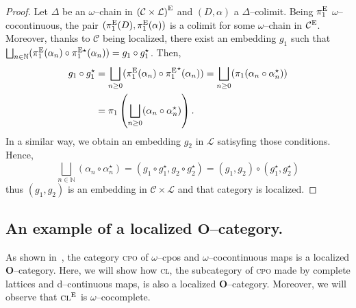 \begin{proof}
  Let \(\Delta\) be an \(\omega\)--chain in \({(\mathcal{C} \times \mathcal{L})}^\textup{E}\) and \((D,\alpha)\) a \(\Delta\)--colimit. %
  Being \(\pi_1^\textup{E}\) \(\omega\)--cocontinuous, the pair \((\pi_1^\textup{E}(D),\pi_1^\textup{E}(\alpha))\) is a colimit for some \(\omega\)--chain in \(\mathcal{C}^\textup{E}\). %
  Moreover, thanks to \(\mathcal{C}\) being localized, there exist an embedding \(g_1\) such that \(\bigsqcup_{n \in \mathbb{N}}(\pi_1^\textup{E}(\alpha_n) \circ \pi_1^{\textup{E}\star}(\alpha_n)) = g_1 \circ g_1^\star\). %
  Then,
  \begin{equation*}
    \begin{split}
      g_1 \circ g_1^\star &= \bigsqcup_{n \ge 0}(\pi_1^\textup{E}(\alpha_n) \circ {\pi_1^{\textup{E}}}^\star(\alpha_n))
      = \bigsqcup_{n \ge 0}(\pi_1(\alpha_n\circ \alpha_n^\star)) \\
      &= \pi_1\left(\bigsqcup_{n \ge 0}(\alpha_n\circ \alpha_n^\star)\right).
    \end{split}
    \end{equation*}
  In a similar way, we obtain an embedding \(g_2\) in \(\mathcal{L}\) satisyfing those conditions.
  Hence,
  \begin{equation*}
    \bigsqcup_{n \in \mathbb{N}}(\alpha_n\circ \alpha_n^\star)
    = (g_1 \circ g_1^\star, g_2 \circ g_2^\star)
    = (g_1,g_2) \circ (g_1^\star,g_2^\star)
  \end{equation*}
  thus \((g_1,g_2)\) is an embedding in \(\mathcal{C} \times \mathcal{L}\) and that category is localized. \qedhere
\end{proof}

\subsection{An example of a localized \(\mathbf{O}\)--category.}

As shown in~\cite{Hemerik1988}, the category \textsc{cpo} of \(\omega\)--cpos and \(\omega\)--cocontinuous maps is a localized \(\mathbf{O}\)--category. %
Here, we will show how \textsc{cl}, the subcategory of \textsc{cpo} made by complete lattices and d--continuous maps, is also a localized \(\mathbf{O}\)--category. %
Moreover, we will observe that \(\mathrm{\textsc{cl}}^\textup{E}\) is \(\omega\)--cocomplete. %

